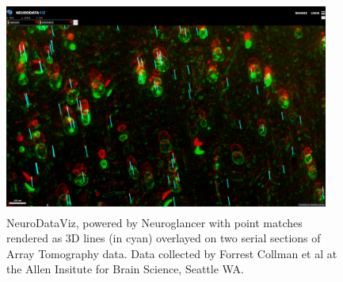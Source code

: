 \documentclass[simplex.tex]{subfiles}
\begin{document}
\begin{figure}[!h]
\begin{cframed}
\centering
\includegraphics[width=0.95\textwidth, height = 2.75in]{../../figs/ndvizpointmatch.png}
\caption{NeuroDataViz, powered by Neuroglancer with point matches rendered as 3D lines (in cyan) overlayed on two serial sections of Array Tomography data. Data collected by Forrest Collman et al at the Allen Insitute for Brain Science, Seattle WA.}
\label{fig:name}
\end{cframed}
\end{figure}

\clearpage
\end{document}

